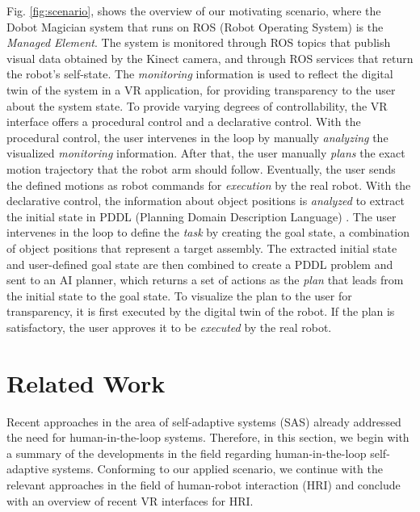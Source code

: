 \documentclass[10pt, conference]{IEEEtran}
\begin{document}
Fig. \ref{fig:scenario}, shows the overview of our motivating scenario, where the Dobot Magician system that runs on ROS (Robot Operating System) is the \textit{Managed Element}. The system is monitored through ROS topics that publish visual data obtained by the Kinect camera, and through ROS services that return the robot's self-state. The \textit{monitoring} information is used to reflect the digital twin of the system in a VR application, for providing transparency to the user about the system state. To provide varying degrees of controllability, the VR interface offers a procedural control and a declarative control. With the procedural control, the user intervenes in the loop by manually \textit{analyzing} the visualized \textit{monitoring} information. After that, the user manually \textit{plans} the exact motion trajectory that the robot arm should follow. Eventually, the user sends the defined motions as robot commands for \textit{execution} by the real robot. With the declarative control, the information about object positions is \textit{analyzed} to extract the initial state in PDDL (Planning Domain Description Language) \cite{pddl_1998}. The user intervenes in the loop to define the \textit{task} by creating the goal state, a combination of object positions that represent a target assembly. The extracted initial state and user-defined goal state are then combined to create a PDDL problem and sent to an AI planner, which returns a set of actions as the \textit{plan} that leads from the initial state to the goal state. To visualize the plan to the user for transparency, it is first executed by the digital twin of the robot. If the plan is satisfactory, the user approves it to be \textit{executed} by the real robot. 


\section{Related Work}
\label{rel_work}
Recent approaches in the area of self-adaptive systems (SAS) already addressed the need for human-in-the-loop systems. Therefore, in this section, we begin with a summary of the developments in the field regarding human-in-the-loop self-adaptive systems. Conforming to our applied scenario, we continue with the relevant approaches in the field of human-robot interaction (HRI) and conclude with an overview of recent VR interfaces for HRI.
\end{document}
